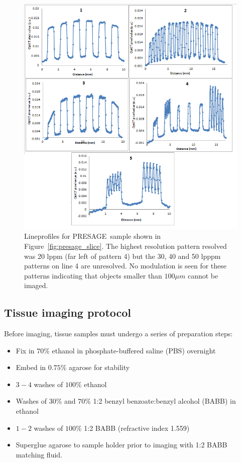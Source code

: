 	\begin{figure}[H]
		\centering
		\includegraphics[width=\textwidth]{meth_img/P19_lineprofiles.png}
		\caption{Lineprofiles for PRESAGE\texttrademark ~sample shown in Figure~\ref{fig:presage_slice}. The highest resolution pattern resolved was 20 lppm (far left of pattern 4) but  the 30, 40 and 50 lpppm patterns on line 4 are unresolved. No modulation is seen for these patterns indicating that objects smaller than $100\mu m$ cannot be imaged.}
		\label{fig:P19_lp}
	\end{figure}




\subsection{Tissue imaging protocol}



Before imaging, tissue samples must undergo a series of preparation steps:
\begin{itemize}
	\item Fix in $70\%$ ethanol in phosphate-buffered saline (PBS) overnight
	\item Embed in $0.75\%$ agarose for stability
	\item $3-4$ washes of $100\%$ ethanol
	\item Washes of $30\%$ and $70\%$ 1:2 benzyl benzoate:benzyl alcohol (BABB) in ethanol
	\item $1-2$ washes of $100\%$ 1:2 BABB (refractive index 1.559)
	\item Superglue agarose to sample holder prior to imaging with 1:2 BABB matching fluid.
\end{itemize}



